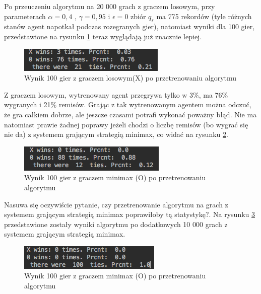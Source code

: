 \documentclass[licencjacka]{pracamgr}
\begin{document}
Po przeuczeniu algorytmu na 20 000 grach z graczem losowym, przy parameterach $\alpha=0,4$ , $\gamma=0,95$ i $\epsilon=0$ zbiór $q_{s}$ ma 775 rekordów (tyle różnych stanów  agent napotkał podczas rozegranych gier), natomiast wyniki dla 100 gier, przedstawione na rysunku \ref{Rys16} teraz wyglądają już znacznie lepiej.\\

\begin{figure}[h!]
	\includegraphics [scale=0.7]{Qtable_vs_Rnd_trained.png}
	\caption{Wynik 100 gier z graczem losowym(X) po przetrenowaniu algorytmu}
	\label{Rys16}
\end{figure}


Z graczem losowym, wytrenowany agent przegrywa tylko w 3\%, ma 76\% wygranych i 21\% remisów. Grając z tak wytrenowanym agentem można odczuć, że gra całkiem dobrze, ale jeszcze czasami potrafi wykonać poważny błąd. Nie ma natomiast prawie żadnej poprawy jeżeli chodzi o liczbę remisów (bo wygrać się nie da) z systemem grającym strategią minimax, co widać na rysunku \ref{Rys17}. \\

\begin{figure}[h!]
	\includegraphics [scale=0.7]{QTable_vs_Minimax_trained.png}
	\caption{Wynik 100 gier z graczem minimax (O) po przetrenowaniu algorytmu}
	\label{Rys17}
\end{figure}

Nasuwa się oczywiście pytanie, czy przetrenowanie algorytmu na grach z systemem grającym strategią minimax poprawiłoby tą statystykę?. Na rysunku \ref{Rys18} przedstawione zostały wyniki algorytmu po dodatkowych 10 000 grach z systemem grającym strategią minimax.\\

\begin{figure}[h!]
	\includegraphics [scale=0.7]{QTable_vs_Minimax_trained_d.png}
	\caption{Wynik 100 gier z graczem minimax (O) po przetrenowaniu algorytmu}
	\label{Rys18}
\end{figure}
\end{document}
